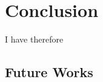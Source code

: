 \chapter*{Conclusion}
%


I have therefore
%
\section*{Future Works}
%

%
\afterpage{\blankpage}
\newpage
